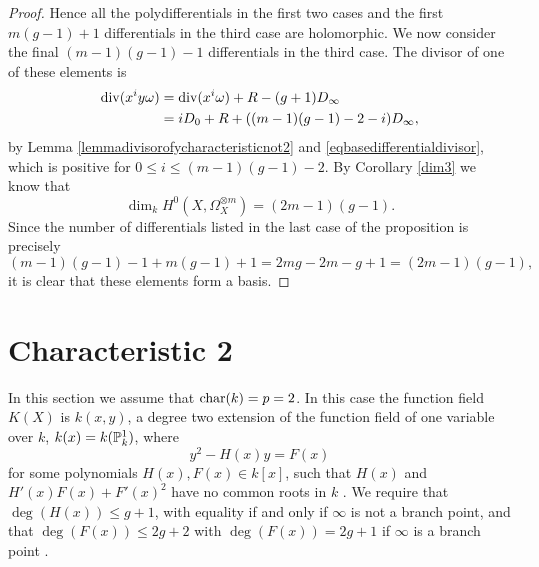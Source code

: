 \begin{proof}
    Hence all the polydifferentials in the first two cases and the first $m(g-1)+1$ differentials in the third case are holomorphic.
    We now consider the final $(m-1)(g-1) - 1$ differentials in the third case.
    The divisor of one of these elements is
        \begin{align*}
        \operatorname{div} (x^iy\omega) & =  \operatorname{div}(x^i\omega) + R -(g+1)D_\infty \\
        & =  iD_0 + R +((m-1)(g-1)-2-i)D_\infty,
        \end{align*}
    by Lemma \ref{lemmadivisorofycharacteristicnot2} and \eqref{eqbasedifferentialdivisor}, which is positive for $0\leq i \leq (m-1)(g-1)-2$.
    By Corollary \ref{dim3} we know that 
        \[
        \dim_kH^0(X,\Omega_X^{\otimes m}) = (2m-1)(g-1).
        \]
    Since the number of differentials listed in the last case of the proposition is precisely
        \[
        (m-1)(g-1)-1 + m(g-1) +1 = 2mg -2m -g + 1 = (2m-1)(g-1),
        \]
    it is clear that these elements form a basis.
    \end{proof}


\section{Characteristic 2}

In this section we assume that $\operatorname{char}(k) = p  =2$.   
In this case the function field $K(X)$ is $k(x,y)$, a degree two extension of the function field of one variable over $k$, $k(x) = k({\mathbb P}_k^1)$, where
    \begin{equation}\label{ext}
    y^2 - H(x)y = F(x)
    \end{equation}
for some polynomials $H(x), F(x)\in k[x]$, such that $H(x)$ and $H'(x)F(x) + F'(x)^2$ have no common roots in $k$ \cite[Prop.\ 7.4.24]{liu}.
We require that $\deg(H(x)) \leq g+1$, with equality if and only if $\infty$ is not a branch point, and that $\deg(F(x)) \leq 2g+2$ with $\deg(F(x)) = 2g+1$ if $\infty$ is a branch point  \cite[Prop.\ 7.4.24]{liu}.

